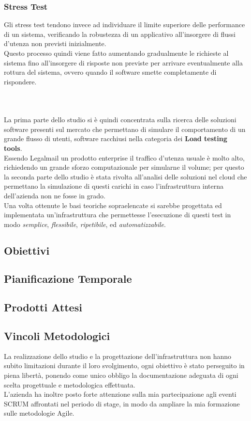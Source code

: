 \subsubsection{Stress Test}
Gli stress test tendono invece ad individuare il limite superiore delle performance di un sistema, verificando la robustezza di un applicativo all'insorgere di flussi d'utenza non previsti inizialmente. \\
Questo processo quindi viene fatto aumentando gradualmente le richieste al sistema fino all'insorgere di risposte non previste per arrivare eventualmente alla rottura del sistema, ovvero quando il software smette completamente di rispondere. \\\\\\\\
La prima parte dello studio si è quindi concentrata sulla ricerca delle soluzioni software presenti sul mercato che permettano di simulare il comportamento di un grande flusso di utenti, software racchiusi nella categoria dei \textbf{Load testing tools}. \\
Essendo Legalmail un prodotto enterprise il traffico d'utenza usuale è molto alto, richiedendo un grande sforzo computazionale per simularne il volume; per questo la seconda parte dello studio è stata rivolta all'analisi delle soluzioni nel cloud che permettano la simulazione di questi carichi in caso l'infrastruttura interna dell'azienda non ne fosse in grado. \\
Una volta ottenute le basi teoriche sopraelencate si sarebbe progettata ed implementata un'infrastruttura che permettesse l'esecuzione di questi test in modo \textit{semplice}, \textit{flessibile}, \textit{ripetibile}, ed \textit{automatizzabile}.
\subsection{Obiettivi}
\subsection{Pianificazione Temporale}
\subsection{Prodotti Attesi}
\subsection{Vincoli Metodologici}
La realizzazione dello studio e la progettazione dell'infrastruttura non hanno subito limitazioni durante il loro svolgimento, ogni obiettivo è stato perseguito in piena libertà, ponendo come unico obbligo la documentazione adeguata di ogni scelta progettuale e metodologica effettuata. \\
L'azienda ha inoltre posto forte attenzione sulla mia partecipazione agli eventi SCRUM affrontati nel periodo di stage, in modo da ampliare la mia formazione sulle metodologie Agile.
